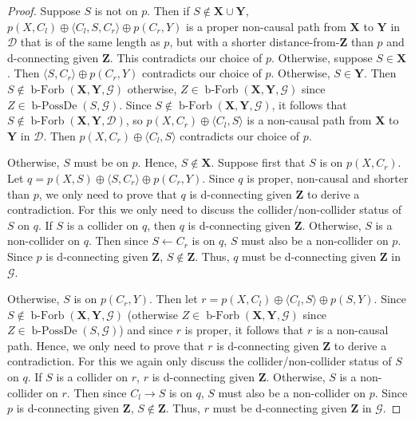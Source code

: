 \documentclass[letterpaper]{article}
\theoremstyle{definition}
\theoremstyle{remark}
\DeclareMathOperator{\bPossDe}{b-PossDe}
\DeclareMathOperator{\bForbb}{b-Forb}
\newcommand{\g}[1][G]{\mathcal{#1}}
\newcommand{\bfb}[2][X,Y]{\bForbb(\mathbf{#1},#2)}
\begin{document}
\begin{proof}
Suppose $S$ is not on $p$. Then if $S \notin \mathbf{X} \cup \mathbf{Y}$, $p(X,C_l) \oplus \langle C_l ,S,C_r\rangle \oplus p(C_r,Y)$ is a proper non-causal path from $\mathbf{X}$ to $\mathbf{Y}$ in $\g[D]$ that is of the same length as $p$, but with a shorter distance-from-$\mathbf{Z}$ than $p$ and d-connecting given $\mathbf{Z}$. This contradicts our choice of $p$. Otherwise, suppose $S \in \mathbf{X}$. Then $\langle S ,C_r \rangle \oplus p(C_r, Y)$ contradicts our choice of $p$. Otherwise, $S \in \mathbf{Y}$. Then $S \notin \bfb{\g}$ otherwise, $Z \in \bfb{\g}$ since $Z \in \bPossDe(S,\g)$. Since $S \notin \bfb{\g}$, it follows that $S \notin \bfb{\g[D]}$, so $p(X,C_r) \oplus \langle C_l,S \rangle$ is a non-causal path from $\mathbf{X}$ to $\mathbf{Y}$ in $\g[D]$. Then $p(X,C_r) \oplus \langle C_l,S \rangle$ contradicts our choice of $p$.

Otherwise, $S$ must be on $p$. Hence, $S \notin \mathbf{X}$. Suppose first that $S$ is on $p(X,C_r)$. Let $q= p(X,S) \oplus \langle S,C_r\rangle \oplus p(C_r, Y)$. Since $q$ is proper, non-causal and shorter than $p$, we only need to prove that $q$ is d-connecting given $\mathbf{Z}$ to derive a contradiction. For this we only need to discuss the collider/non-collider status of $S$ on $q$. If $S$ is a collider on $q$, then $q$ is d-connecting given $\mathbf{Z}$. Otherwise, $S$ is a non-collider on $q$. Then since $S \leftarrow C_r$ is on $q$, $S$ must also be a non-collider on $p$. Since $p$ is d-connecting given $\mathbf{Z}$, $S \notin \mathbf{Z}$. Thus, $q$ must be d-connecting given $\mathbf{Z}$ in $\g$. 

Otherwise, $S$ is on $p(C_r,Y)$. Then let $r = p(X,C_l) \oplus \langle C_l,S \rangle \oplus p(S,Y)$. Since $S \notin \bfb{\g}$ (otherwise $Z \in \bfb{\g}$ since $Z \in \bPossDe(S,\g)$) and since $r$ is proper, it follows that $r$ is a non-causal path. Hence, we only need to prove that $r$ is d-connecting given $\mathbf{Z}$ to derive a contradiction.  For this we again only discuss the collider/non-collider status of $S$ on $q$. If $S$ is a collider on $r$, $r$ is d-connecting given $\mathbf{Z}$. Otherwise, $S$ is a non-collider on $r$. Then since $C_l \rightarrow S$ is on $q$, $S$ must also be a non-collider on $p$. Since $p$ is d-connecting given $\mathbf{Z}$, $S \notin \mathbf{Z}$. Thus, $r$ must be d-connecting given $\mathbf{Z}$ in $\g$. 
\end{proof}
\end{document}
